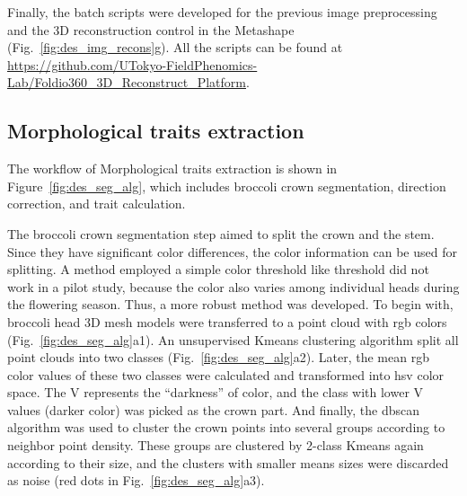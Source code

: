 Finally, the batch scripts were developed for the previous image preprocessing and the 3D reconstruction control in the Metashape (Fig.~\ref{fig:des_img_recons}g). All the scripts can be found at \url{https://github.com/UTokyo-FieldPhenomics-Lab/Foldio360_3D_Reconstruct_Platform}.

\subsection{Morphological traits extraction}\label{sec:mte}

The workflow of Morphological traits extraction is shown in Figure~\ref{fig:des_seg_alg}, which includes broccoli crown segmentation, direction correction, and trait calculation.



The broccoli crown segmentation step aimed to split the crown and the stem. Since they have significant color differences, the color information can be used for splitting. A method employed a simple color threshold like \citet{otsu_threshold_1979} threshold did not work in a pilot study, because the color also varies among individual heads during the flowering season. Thus, a more robust method was developed. To begin with, broccoli head 3D mesh models were transferred to a point cloud with \gls{rgb} colors (Fig.~\ref{fig:des_seg_alg}a1). An unsupervised Kmeans clustering algorithm split all point clouds into two classes (Fig.~\ref{fig:des_seg_alg}a2). Later, the mean \gls{rgb} color values of these two classes were calculated and transformed into \gls{hsv} color space. The V represents the ``darkness'' of color, and the class with lower V values (darker color) was picked as the crown part. And finally, the \gls{dbscan} algorithm was used to cluster the crown points into several groups according to neighbor point density. These groups are clustered by 2-class Kmeans again according to their size, and the clusters with smaller means sizes were discarded as noise (red dots in Fig.~\ref{fig:des_seg_alg}a3).

